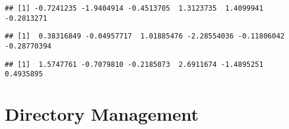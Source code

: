 \documentclass[11pt,]{article}
\newenvironment{Shaded}{\begin{snugshade}}{\end{snugshade}}
\newcommand{\KeywordTok}[1]{\textcolor[rgb]{0.13,0.29,0.53}{\textbf{#1}}}
\newcommand{\DecValTok}[1]{\textcolor[rgb]{0.00,0.00,0.81}{#1}}
\newcommand{\StringTok}[1]{\textcolor[rgb]{0.31,0.60,0.02}{#1}}
\newcommand{\CommentTok}[1]{\textcolor[rgb]{0.56,0.35,0.01}{\textit{#1}}}
\newcommand{\ControlFlowTok}[1]{\textcolor[rgb]{0.13,0.29,0.53}{\textbf{#1}}}
\newcommand{\OperatorTok}[1]{\textcolor[rgb]{0.81,0.36,0.00}{\textbf{#1}}}
\newcommand{\NormalTok}[1]{#1}
\begin{document}
\begin{Shaded}
\end{Shaded}

\begin{verbatim}
## [1] -0.7241235 -1.9404914 -0.4513705  1.3123735  1.4099941 -0.2813271
\end{verbatim}

\begin{Shaded}
\end{Shaded}

\begin{verbatim}
## [1]  0.38316849 -0.04957717  1.01885476 -2.28554036 -0.11806042 -0.28770394
\end{verbatim}

\begin{Shaded}
\end{Shaded}

\begin{verbatim}
## [1]  1.5747761 -0.7079810 -0.2185073  2.6911674 -1.4895251  0.4935895
\end{verbatim}

\section{Directory Management}\label{directory-management}
\end{document}
